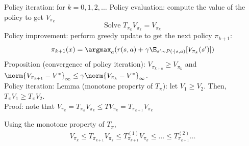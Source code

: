 \noindent Policy iteration: for $k=0,1,2,\dots$ Policy evaluation: compute the value of the policy to get $V_{\pi_k}$
\[
    \text{Solve } T_{\pi_k} V_{\pi_k} = V_{\pi_k}
\]
Policy improvement: perform greedy update to get the next policy $\pi_{k+1}$:
\[
    \pi_{k+1}(x) = \argmax_{a} (r(s,a) + \gE [V_{\pi_k}(s')])
\]
Proposition (convergence of policy iteration): $V_{\pi_{k+a}} \geq V_{\pi_k}$ and $\norm{V_{\pi_{k+1}} - V^*}_{\infty} \leq \gamma \norm{V_{\pi_k} - V^*}_{\infty}$. \\

\noindent Policy iteration:
Lemma (monotone property of $T_\pi$): let $V_1 \geq V_2$. Then, $T_\pi V_1 \geq T_\pi V_2$. \\

\noindent Proof: note that $V_{\pi_k} = T_{\pi_k} V_{\pi_k} \leq TV_{\pi_k} = T_{\pi_{k+1}} V_{\pi_k} $

Using the monotone property of $T_\pi$,
\begin{align*}
    V_{\pi_k} \leq T_{\pi_{k+1}} V_{\pi_k} \leq T_{\pi_{k+1}}^{(1)} V_{\pi_k} \leq \dots \leq T_{\pi_{k+1}}^{(2)} \dots
\end{align*}